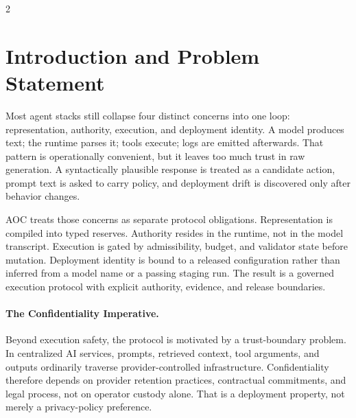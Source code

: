 \documentclass[11pt]{article}
\theoremstyle{remark}
\newcommand{\AOC}{\textup{\textsc{AOC}}}
\begin{document}
\renewcommand{\contentsname}{Contents}
\begin{multicols*}{2}
\raggedcolumns
\footnotesize
\setlength{\columnsep}{1.5em}
\setlength{\multicolsep}{0.75em}
\tableofcontents
\end{multicols*}
\newpage

\section{Introduction and Problem Statement}

Most agent stacks still collapse four distinct concerns into one loop: representation, authority, execution, and deployment identity. A model produces text; the runtime parses it; tools execute; logs are emitted afterwards. That pattern is operationally convenient, but it leaves too much trust in raw generation. A syntactically plausible response is treated as a candidate action, prompt text is asked to carry policy, and deployment drift is discovered only after behavior changes.

\AOC{} treats those concerns as separate protocol obligations. Representation is compiled into typed reserves. Authority resides in the runtime, not in the model transcript. Execution is gated by admissibility, budget, and validator state before mutation. Deployment identity is bound to a released configuration rather than inferred from a model name or a passing staging run. The result is a governed execution protocol with explicit authority, evidence, and release boundaries.

\paragraph{The Confidentiality Imperative.}
Beyond execution safety, the protocol is motivated by a trust-boundary problem. In centralized AI services, prompts, retrieved context, tool arguments, and outputs ordinarily traverse provider-controlled infrastructure. Confidentiality therefore depends on provider retention practices, contractual commitments, and legal process, not on operator custody alone. That is a deployment property, not merely a privacy-policy preference.
\end{document}
